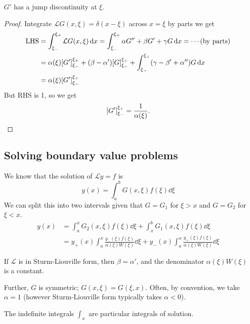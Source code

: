 \documentclass[a4paper]{article}
\begin{document}
\begin{proposition}
    $G'$ has a jump discontinuity at $\xi$. 
\end{proposition}
\begin{proof}
    Integrate $ \mathcal{L} G(x,\xi)=\delta(x-\xi) $ across $ x=\xi $ by parts we get 
    \begin{align*}
        \text{LHS} &= \int_{\xi_-}^{\xi_+} \mathcal{L} G(x,\xi) \,\mathrm{d}x
        = \int_{\xi_-}^{\xi_+} \alpha G'' + \beta G' + \gamma G \,\mathrm{d}x
        = \cdots (\text{by parts}) \\
        &= \alpha(\xi) \qty[G']_{\xi_-}^{\xi_+} + (\beta-\alpha') \qty[G]_{\xi_-}^{\xi_+}  + 
        \int_{\xi_-}^{\xi_+} (\gamma-\beta'+\alpha'')G \,\mathrm{d}x\\ 
        &= \alpha(\xi) \qty[G']_{\xi_-}^{\xi_+}
    \end{align*}
    But RHS is 1, so we get 
    \[
         \qty[G']_{\xi_-}^{\xi_+} = \frac{1}{\alpha(\xi)}.\qedhere
    \]
\end{proof}

\subsection{Solving boundary value problems}
We know that the solution of \( \mathcal L y = f \) is
\[
	y(x) = \int_a^b G(x,\xi) f(\xi) \dd{\xi}
\]
We can split this into two intervals given that \( G = G_1 \) for \( \xi > x \) and \( G = G_2 \) for \( \xi < x \).
\begin{align*}
	y(x) & = \int_a^x G_2(x,\xi) f(\xi) \dd{\xi} + \int_x^b G_1(x,\xi) f(\xi) \dd{\xi}                                                               \\
	     & = y_+(x) \int_a^x \frac{y_-(\xi) f(\xi)}{\alpha(\xi)W(\xi)} \dd{\xi} + y_-(x) \int_a^x \frac{y_+(\xi) f(\xi)}{\alpha(\xi)W(\xi)} \dd{\xi}
\end{align*}
\begin{note}
    If \( \mathcal L \) is in Sturm-Liouville form, then \( \beta = \alpha' \), and the denominator \( \alpha(\xi)W(\xi) \) is a constant.

    Further, \( G \) is symmetric; \( G(x,\xi) = G(\xi,x) \).
Often, by convention, we take \( \alpha = 1 \) (however Sturm-Liouville form typically takes \( \alpha < 0 \)).

The indefinite integrals $ \int_{x} $ are particular integrals of solution. 
\end{note}
\end{document}
